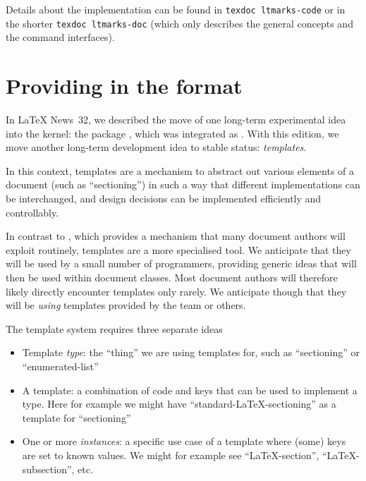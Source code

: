\documentclass{ltnews}
\begin{document}
Details about the implementation can be found in \texttt{texdoc
  ltmarks-code} or in the shorter \texttt{texdoc ltmarks-doc} (which
only describes the general concepts and  the command interfaces).


\section{Providing  in the format}

In \LaTeX{} News~32, we described the move of one long-term experimental idea
into the kernel: the package , which was integrated as .
With this edition, we move another long-term development idea to stable status:
\emph{templates}.

In this context, templates are a mechanism to abstract out various elements
of a document (such as \enquote{sectioning}) in such a way that different
implementations can be interchanged,
and design decisions can be implemented efficiently and controllably.

In contrast to , which provides a mechanism that many document
authors will exploit routinely, templates are a more specialised tool. We
anticipate that they will be used by a small number of programmers, providing
generic ideas that will then be used within document classes. Most document
authors will therefore likely directly encounter templates only rarely.
We anticipate though that they will be \emph{using} templates provided
by the team or others.


The template system requires three separate ideas
\begin{itemize}
  \item Template \emph{type}: the \enquote{thing} we are using templates
    for, such as \enquote{sectioning} or \enquote{enumerated-list}
  \item A template: a combination of code and keys that can be used
    to implement a type. Here for example we might have
    \enquote{standard-\LaTeX{}-sectioning} as a template for
    \enquote{sectioning}
  \item One or more \emph{instances}: a specific use case of a template
    where (some) keys are set to known values. We might for example see
    \enquote{\LaTeX{}-section}, \enquote{\LaTeX{}-subsection}, etc.
\end{itemize}
\end{document}
